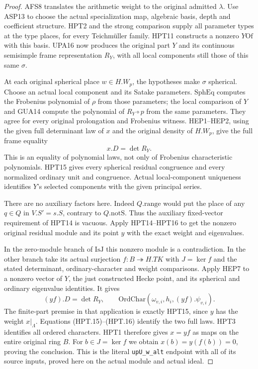 \documentclass[11pt,a4paper]{article}
\numberwithin{equation}{section}
\theoremstyle{remark}\newtheorem{remark}[theorem]{Remark}
\begin{document}
\begin{proof}
AFS8 translates the arithmetic weight to the original admitted
$\lambda$.  Use ASP13 to choose the actual specialization map,
algebraic basis, depth and coefficient structure.  HPT2 and the
strong comparison supply all parameter types at the type places,
for every Teichm\"uller family.  HPT11 constructs a nonzero
$Y\mathrm{Of}$ with this basis.  UPA16 now produces the original
part $Y$ and its continuous semisimple frame representation $R_Y$,
with all local components still those of this same $\sigma$.

At each original spherical place $w\in H.W_p$, the hypotheses
make $\sigma$ spherical.  Choose an actual local component and
its Satake parameters.  $\mathrm{SphEq}$ computes the Frobenius
polynomial of $\rho$ from those parameters; the local comparison
of $Y$ and GUA14 compute the polynomial of $R_Y\circ p$ from
the same parameters.  They agree for every original prolongation
and Frobenius witness.  HEP1--HEP2, using the given full determinant
law of $x$ and the original density of $H.W_p$, give the full
frame equality
\[
                              x.D=\det R_Y.                    \tag{HPT.15}
\]
This is an equality of polynomial laws, not only of Frobenius
characteristic polynomials.  HPT15 gives every spherical residual
congruence and every normalized ordinary unit and congruence.
Actual local-component uniqueness identifies $Y$'s selected
components with the given principal series.

There are no auxiliary factors here.  Indeed $Q.\mathrm{range}$
would put the place of any $q\in Q$ in $V.S'=s.S$, contrary
to $Q.\mathrm{notS}$.  Thus the auxiliary fixed-vector requirement
of HPT14 is vacuous.  Apply HPT14--HPT16 to get the nonzero
original residual module and its point $y$ with the exact
weight and eigenvalues.

In the zero-module branch of $\mathrm{IsJ}$ this nonzero module
is a contradiction.  In the other branch take its actual
surjection $f:B\twoheadrightarrow H.TK$ with $J=\ker f$ and
the stated determinant, ordinary-character and weight comparisons.
Apply HEP7 to a nonzero vector of $Y$, the just constructed
Hecke point, and its spherical and ordinary eigenvalue identities.
It gives
\[
                (yf).D=\det R_Y,\qquad
       \mathrm{OrdChar}(\omega_{v,i},h_i,(yf).\psi_{v,i}).       \tag{HPT.16}
\]
The finite-part premise in that application is exactly HPT15,
since $y$ has the weight $x|_\Lambda$.  Equations
(HPT.15)--(HPT.16) identify the two full laws.  HPT3 identifies
all ordered characters.  HPT1 therefore gives $x=yf$ as maps on
the entire original ring $B$.  For $b\in J=\ker f$ we obtain
$x(b)=y(f(b))=0$, proving the conclusion.  This is the literal
\texttt{up\allowbreak U\_\allowbreak w\_\allowbreak alt} endpoint with all of its source inputs,
proved here on the actual module and actual ideal.
\end{proof}
\end{document}
